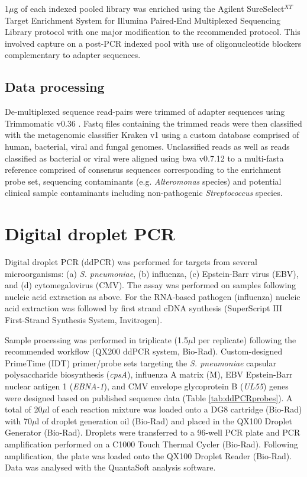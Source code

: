 1$\mu$g of each indexed pooled library was enriched using the Agilent SureSelect$^{XT}$ Target Enrichment System for Illumina Paired-End Multiplexed Sequencing Library protocol with one major modification to the recommended protocol. This involved capture on a post-PCR indexed pool with use of oligonucleotide blockers complementary to adapter sequences.

\subsection{Data processing}
De-multiplexed sequence read-pairs were trimmed of adapter sequences using Trimmomatic v0.36 \parencite{Bolger2014}. Fastq files containing the trimmed reads were then classified with the metagenomic classifier Kraken v1 \parencite{Wood2014} using a custom database comprised of human, bacterial, viral and fungal genomes. Unclassified reads as well as reads classified as bacterial or viral were aligned using bwa v0.7.12\parencite{Li2009} to a multi-fasta reference comprised of consensus sequences corresponding to the enrichment probe set, sequencing contaminants (e.g. \textit{Alteromonas} species) and potential clinical sample contaminants including non-pathogenic \textit{Streptococcus} species.


\section{Digital droplet PCR}
Digital droplet PCR (ddPCR) was performed for targets from several microorganisms: (a) \textit{S. pneumoniae}, (b) influenza,  (c) Epstein-Barr virus (EBV), and (d) cytomegalovirus (CMV). The assay was performed on samples following nucleic acid extraction as above. For the RNA-based pathogen (influenza) nucleic acid extraction was followed by first strand cDNA synthesis (SuperScript III First-Strand Synthesis System, Invitrogen). 

Sample processing was performed in triplicate (1.5$\mu$l per replicate) following the recommended workflow (QX200 ddPCR system, Bio-Rad). Custom-designed PrimeTime (IDT) primer/probe sets targeting the \textit{S. pneumoniae} capsular polysaccharide biosynthesis (\textit{cpsA}), influenza A matrix (M), EBV Epstein-Barr nuclear antigen 1 (\textit{EBNA-1}), and CMV envelope glycoprotein B (\textit{UL55}) genes were designed based on published sequence data \parencite{Park2010} \parencite{Shu2011} \parencite{Ryan2004} \parencite{Sedlak2014} (Table \ref{tab:ddPCRprobes}). A total of 20$\mu$l of each reaction mixture was loaded onto a DG8 cartridge (Bio-Rad) with 70$\mu$l of droplet generation oil (Bio-Rad) and placed in the QX100 Droplet Generator (Bio-Rad). Droplets were transferred to a 96-well PCR plate and PCR amplification performed on a C1000 Touch Thermal Cycler (Bio-Rad). Following amplification, the plate was loaded onto the QX100 Droplet Reader (Bio-Rad). Data was analysed with the QuantaSoft analysis software.

